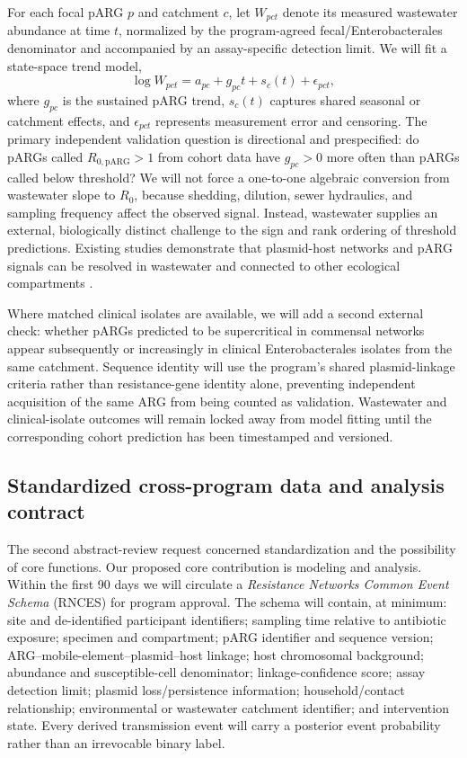\documentclass[12pt,a4paper]{article}
\newcommand{\RpARG}{R_{0,\mathrm{pARG}}}
\begin{document}
For each focal pARG $p$ and catchment $c$, let $W_{pct}$ denote its measured wastewater abundance at time $t$, normalized by the program-agreed fecal/Enterobacterales denominator and accompanied by an assay-specific detection limit. We will fit a state-space trend model,
\begin{equation}
\log W_{pct}=a_{pc}+g_{pc}t+s_c(t)+\epsilon_{pct},
\label{eq:wastewater}
\end{equation}
where $g_{pc}$ is the sustained pARG trend, $s_c(t)$ captures shared seasonal or catchment effects, and $\epsilon_{pct}$ represents measurement error and censoring. The primary independent validation question is directional and prespecified: do pARGs called $\RpARG>1$ from cohort data have $g_{pc}>0$ more often than pARGs called below threshold? We will not force a one-to-one algebraic conversion from wastewater slope to $R_0$, because shedding, dilution, sewer hydraulics, and sampling frequency affect the observed signal. Instead, wastewater supplies an external, biologically distinct challenge to the sign and rank ordering of threshold predictions. Existing studies demonstrate that plasmid-host networks and pARG signals can be resolved in wastewater and connected to other ecological compartments \citep{matlock2023,risely2024,mao2025}.

Where matched clinical isolates are available, we will add a second external check: whether pARGs predicted to be supercritical in commensal networks appear subsequently or increasingly in clinical Enterobacterales isolates from the same catchment. Sequence identity will use the program's shared plasmid-linkage criteria rather than resistance-gene identity alone, preventing independent acquisition of the same ARG from being counted as validation. Wastewater and clinical-isolate outcomes will remain locked away from model fitting until the corresponding cohort prediction has been timestamped and versioned.

\subsection{Standardized cross-program data and analysis contract}
\label{sec:core}

The second abstract-review request concerned standardization and the possibility of core functions. Our proposed core contribution is modeling and analysis. Within the first 90 days we will circulate a \emph{Resistance Networks Common Event Schema} (RNCES) for program approval. The schema will contain, at minimum: site and de-identified participant identifiers; sampling time relative to antibiotic exposure; specimen and compartment; pARG identifier and sequence version; ARG--mobile-element--plasmid--host linkage; host chromosomal background; abundance and susceptible-cell denominator; linkage-confidence score; assay detection limit; plasmid loss/persistence information; household/contact relationship; environmental or wastewater catchment identifier; and intervention state. Every derived transmission event will carry a posterior event probability rather than an irrevocable binary label.
\end{document}

